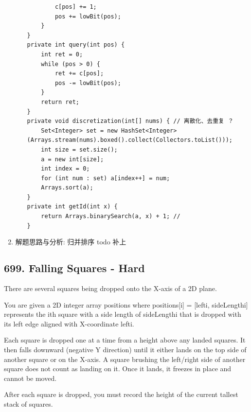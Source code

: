 \documentclass[9pt, b5paaper]{book}
\begin{document}
\begin{enumerate}
\begin{itemize}
\begin{verbatim}
        c[pos] += 1;
        pos += lowBit(pos);
    }
}
private int query(int pos) {
    int ret = 0;
    while (pos > 0) {
        ret += c[pos];
        pos -= lowBit(pos);
    }
    return ret;
}
private void discretization(int[] nums) { // 离散化、去重复 ？
    Set<Integer> set = new HashSet<Integer>(Arrays.stream(nums).boxed().collect(Collectors.toList()));
    int size = set.size();
    a = new int[size];
    int index = 0;
    for (int num : set) a[index++] = num;
    Arrays.sort(a);
}
private int getId(int x) {
    return Arrays.binarySearch(a, x) + 1; // 
}
\end{verbatim}
\end{itemize}
\item 解题思路与分析: 归并排序 todo 补上
\label{sec-1-1-4-3}
\end{enumerate}

\subsection{699. Falling Squares - Hard}
\label{sec-1-1-5}
There are several squares being dropped onto the X-axis of a 2D plane.

You are given a 2D integer array positions where positions[i] = [lefti, sideLengthi] represents the ith square with a side length of sideLengthi that is dropped with its left edge aligned with X-coordinate lefti.

Each square is dropped one at a time from a height above any landed squares. It then falls downward (negative Y direction) until it either lands on the top side of another square or on the X-axis. A square brushing the left/right side of another square does not count as landing on it. Once it lands, it freezes in place and cannot be moved.

After each square is dropped, you must record the height of the current tallest stack of squares.
\end{document}
